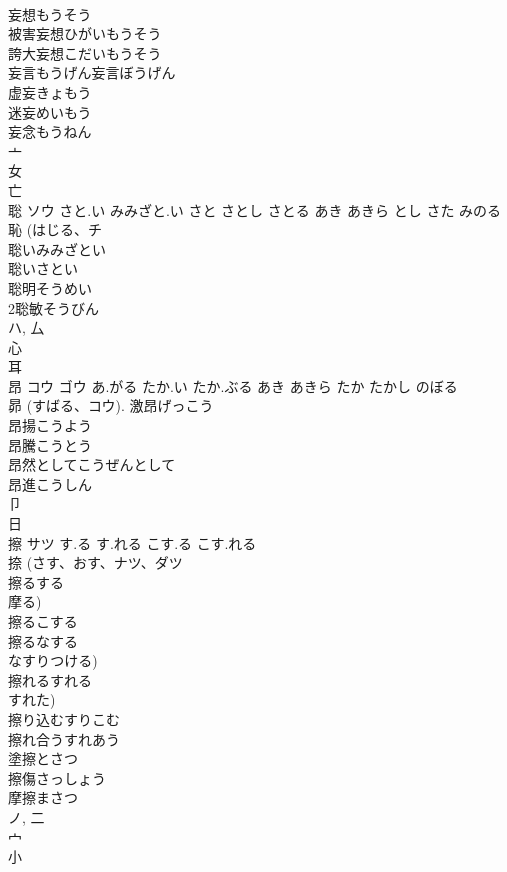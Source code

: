 \documentclass[8pt]{extreport}
\begin{document}
\begin{CJK}{UTF8}{min}
\\	妄想もうそう
\\	被害妄想ひがいもうそう
\\	誇大妄想こだいもうそう
\\	妄言もうげん妄言ぼうげん
\\	虚妄きょもう
\\	迷妄めいもう
\\	妄念もうねん
\\	亠 
\\	女 
\\	亡 
\\	聡	ソウ	さと.い みみざと.い さと さとし さとる あき あきら とし さた みのる	
\\	恥 (はじる、チ 
\\	聡いみみざとい
\\	聡いさとい
\\	聡明そうめい
\\	2聡敏そうびん
\\	ハ, 厶 
\\	心 
\\	耳 
\\	昂	コウ ゴウ	あ.がる たか.い たか.ぶる あき あきら たか たかし のぼる	
\\	昴 (すばる、コウ).		激昂げっこう 
\\	昂揚こうよう 
\\	昂騰こうとう 
\\	昂然としてこうぜんとして 
\\	昂進こうしん 
\\	卩 
\\	日 
\\	擦	サツ	す.る す.れる こす.る こす.れる	
\\	捺 (さす、おす、ナツ、ダツ 
\\	擦るする
\\	摩る) 
\\	擦るこする
\\	擦るなする
\\	なすりつける) 
\\	擦れるすれる
\\	すれた) 
\\	擦り込むすりこむ
\\	擦れ合うすれあう
\\	塗擦とさつ
\\	擦傷さっしょう
\\	摩擦まさつ
\\	ノ, 二 
\\	宀 
\\	小 

\end{CJK}
\end{document}
